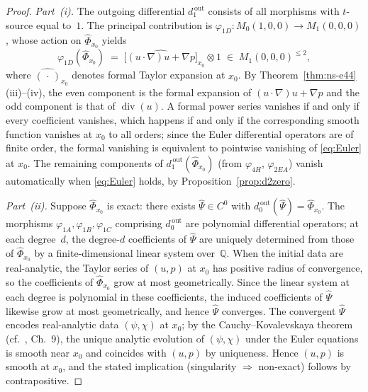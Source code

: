 \documentclass[reqno,10pt]{amsart}
\theoremstyle{definition}
\def\divX{{\operatorname{div}}}
\begin{document}
\begin{proof}
\textit{Part~(i).}
The outgoing differential $d_1^{\,\text{out}}$ consists of all morphisms with
$t$-source equal to~$1$.  The principal contribution is
$\varphi_{1D}: M_0(1,0,0)\to M_1(0,0,0)$, whose action on $\widehat{\Phi}_{x_0}$ yields
\[
  \varphi_{1D}(\widehat{\Phi}_{x_0})
  \;=\; \widehat{\bigl[(u\cdot\nabla)u + \nabla p\bigr]}_{x_0}\otimes 1
  \;\in\; M_1(0,0,0)^{\leq 2},
\]
where $\widehat{(\,\cdot\,)}_{x_0}$ denotes formal Taylor expansion at $x_0$.
By Theorem~\ref{thm:ns-e44}(iii)--(iv), the even component is the formal
expansion of $(u\cdot\nabla)u+\nabla p$ and the odd component is that of
$\divX(u)$.  A formal power series vanishes if and only if every
coefficient vanishes, which happens if and only if the corresponding
smooth function vanishes at $x_0$ to all orders; since the Euler differential
operators are of finite order, the formal vanishing is equivalent to
pointwise vanishing of \eqref{eq:Euler} at $x_0$.  The remaining components
of $d_1^{\,\text{out}}(\widehat{\Phi}_{x_0})$ (from $\varphi_{4H}$,
$\varphi_{2EA}$) vanish automatically when \eqref{eq:Euler} holds, by
Proposition~\ref{prop:d2zero}.

\textit{Part~(ii).}
Suppose $\widehat{\Phi}_{x_0}$ is exact: there exists $\widehat{\Psi}\in C^0$
with $d_0^{\,\text{out}}(\widehat{\Psi})=\widehat{\Phi}_{x_0}$.
The morphisms $\varphi_{1A},\varphi_{1B},\varphi_{1C}$ comprising
$d_0^{\,\text{out}}$ are polynomial differential operators; at each degree~$d$,
the degree-$d$ coefficients of $\widehat{\Psi}$ are uniquely determined
from those of $\widehat{\Phi}_{x_0}$ by a finite-dimensional linear system
over~$\mathbb{Q}$.  When the initial data are real-analytic, the Taylor series
of $(u,p)$ at $x_0$ has positive radius of convergence, so the coefficients
of $\widehat{\Phi}_{x_0}$ grow at most geometrically.  Since the linear
system at each degree is polynomial in these coefficients, the induced
coefficients of $\widehat{\Psi}$ likewise grow at most geometrically, and
hence $\widehat{\Psi}$ converges.  The convergent $\widehat{\Psi}$ encodes
real-analytic data $(\psi,\chi)$ at $x_0$; by the Cauchy--Kovalevskaya
theorem (cf.~\cite{Hormander1963}, Ch.~9), the unique analytic evolution of
$(\psi,\chi)$ under the Euler equations is smooth near $x_0$ and coincides
with $(u,p)$ by uniqueness.  Hence $(u,p)$ is smooth at $x_0$, and
the stated implication (singularity $\Rightarrow$ non-exact) follows
by contrapositive.
\end{proof}
\end{document}
